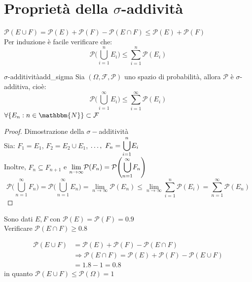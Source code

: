 \documentclass[12pt]{report}
\newcounter{theorem}
\newcounter{exercise}
\newcommand{\nmu}{}
\begin{document}
	\section{Proprietà della $\sigma$-addività}
	$\mathcal{P}(E \cup F) = \mathcal{P}(E) + \mathcal{P}(F) - \mathcal{P}(E \cap F) \leq \mathcal{P}(E) + \mathcal{P}(F)$ \\
	Per induzione è facile verificare che:
	\[
	\mathcal{P}\Bigg(\bigcup_{i=1}^{n}E_i\Bigg) \leq \sum_{i=1}^{n}\mathcal{P}(E_i)
	\]
	\begin{theorem}{\nmu $\sigma$-additività}{add_sigma}
		Sia $(\Omega, \mathcal{F}, \mathcal{P})$ uno spazio di probabilità, allora $\mathcal{P}$ è $\sigma$-additiva, cioè:
		\[
		\mathcal{P}\Bigg(\bigcup_{i=1}^{\infty}E_i\Bigg) \leq \sum_{i=1}^{\infty}\mathcal{P}(E_i)
		\]
		$\forall \{E_n : n \in \mathbbm{N}\} \subset \mathcal{F}$
	\end{theorem}
	\begin{proof}{Dimostrazione della $\sigma-$additività} \quad \\
		Sia: $F_1 = E_1$, $F_2 = E_2 \cup E_1$, $\dots,\ F_n = \mathlarger{\bigcup_{i=1}^{n}}E_i$ \\
		Inoltre, $F_n \subseteq F_{n+1}$ e $\mathlarger{\lim_{n \to \infty}}\mathcal{P}(F_n) = 	\mathcal{P}\Bigg(\mathlarger{\bigcup_{n=1}^{\infty}}F_n\Bigg)$
		\[\mathcal{P}\Bigg(\bigcup_{n=1}^{\infty}F_n\Bigg) = \mathcal{P}\Bigg(\bigcup_{n=1}^{\infty}E_n\Bigg) = \lim_{n \to \infty}\mathcal{P}(E_n) \leq \lim_{n \to \infty}\sum_{i=1}^{n}\mathcal{P}(E_i) = \sum_{n=1}^{\infty}\mathcal{P}(E_n)\]
	\end{proof}
	\begin{exercise}{}{}
		\begin{assignment}{}{}
			Sono dati $E, F$ con $\mathcal{P}(E) = \mathcal{P}(F) = 0.9$ \\
			Verificare $\mathcal{P}(E \cap F) \geq 0.8$
		\end{assignment}
		\begin{align*}
			\mathcal{P}(E \cup F) &= \mathcal{P}(E) + \mathcal{P}(F) - \mathcal{P}(E \cap F) \\ &\Rightarrow \mathcal{P}(E \cap F) = \mathcal{P}(E) + \mathcal{P}(F) - \mathcal{P}(E \cup F) \\ &= 1.8 - 1 = 0.8
		\end{align*}
		in quanto $\mathcal{P}(E \cup F) \leq \mathcal{P}(\Omega) = 1$
	\end{exercise}
\end{document}
